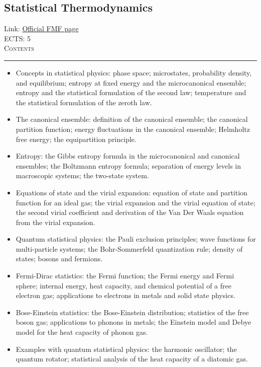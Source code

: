 \documentclass[11pt, a4paper]{article}
\newenvironment{course}[3]{
\subsection{#1}%
Link: \href{#2}{Official FMF page}\\%
ECTS: #3%
\vspace{1ex}
\\
{\large \textsc{Contents}}\\[-0.9ex]%
\rule{\textwidth}{0.5pt}
\vspace{-3ex}
}
{}
\newenvironment{chapter}[1]{
\begin{tcolorbox}[title=#1, breakable]
}
{\end{tcolorbox}}
\begin{document}
\begin{course}{Statistical Thermodynamics}{https://www.fmf.uni-lj.si/en/study-physics/programmes/1fiz/2020/7000777/courses/1174/}{5}
    \begin{chapter}{Part 2: Statistical physics}
        \begin{itemize}
        
            \item Concepts in statistical physics: phase space; microstates, probability density, and equilibrium; entropy at fixed energy and the microcanonical ensemble; entropy and the statistical formulation of the second law; temperature and the statistical formulation of the zeroth law.

            \item The canonical ensemble: definition of the canonical ensemble; the canonical partition function; energy fluctuations in the canonical ensemble; Helmholtz free energy; the equipartition principle.

            \item Entropy: the Gibbs entropy formula in the microcanonical and canonical ensembles; the Boltzmann entropy formula; separation of energy levels in macroscopic systems; the two-state system.

            \item Equations of state and the virial expansion: equation of state and partition function for an ideal gas; the virial expansion and the virial equation of state; the second virial coefficient and derivation of the Van Der Waals equation from the virial expansion.

            \item Quantum statistical physics: the Pauli exclusion principles; wave functions for multi-particle systems; the Bohr-Sommerfeld quantization rule; density of states; bosons and fermions.

            \item Fermi-Dirac statistics: the Fermi function; the Fermi energy and Fermi sphere; internal energy, heat capacity, and chemical potential of a free electron gas; applications to electrons in metals and solid state physics.

            \item Bose-Einstein statistics: the Bose-Einstein distribution; statistics of the free boson gas; applications to phonons in metals; the Einstein model and Debye model for the heat capacity of phonon gas.

            \item Examples with quantum statistical physics: the harmonic oscillator; the quantum rotator; statistical analysis of the heat capacity of a diatomic gas.


\end{itemize}
\end{chapter}
\end{course}
\end{document}
